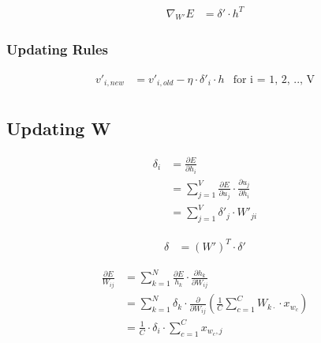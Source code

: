 \documentclass{article}
\begin{document}
	\begin{equation}
		\begin{aligned}	
			\nabla_{W'} E &= \delta' \cdot h^T
		\end{aligned}
	\end{equation}
	
	\subsubsection*{Updating Rules}
	\begin{framed}
	\begin{equation}
		\begin{aligned}
			v'_{i, new} &= v'_{i, old} - \eta \cdot \delta'_i \cdot h &\mbox{for i = 1, 2, .., V}\\
		\end{aligned}
	\end{equation}
	\end{framed}
	
	\subsection{Updating W}
	\begin{equation}
		\begin{aligned}
			\delta_i &= \frac{\partial E}{\partial h_i} \\
			&= \sum_{j=1}^{V} \frac{\partial E}{\partial u_j} \cdot \frac{\partial u_j}{\partial h_i} \\
			&= \sum_{j=1}^{V} \delta'_j \cdot W'_{ji} 
		\end{aligned}
	\end{equation}
	
	\begin{equation}
		\begin{aligned}
			\delta &= (W')^T \cdot \delta'
		\end{aligned}
	\end{equation}
	
	\begin{equation}
		\begin{aligned}
			\frac{\partial E}{W_{ij}} &= \sum_{k=1}^{N} \frac{\partial E}{h_k} \cdot \frac{\partial h_k}{\partial W_{ij}} \\
			&= \sum_{k=1}^{N} \delta_k \cdot \frac{\partial}{\partial W_{ij}} \left(\frac{1}{C} \sum_{c=1}^{C} W_{k\cdot} \cdot x_{w_{c}} \right)\\
			&= \frac{1}{C} \cdot \delta_i \cdot \sum_{c=1}^{C} x_{w_{c}, j}
		\end{aligned}
	\end{equation}
	
\end{document}
